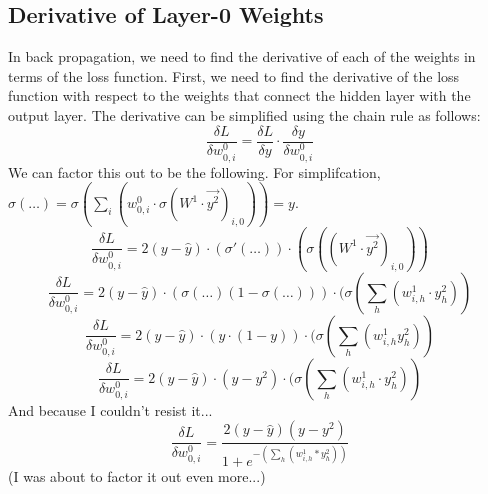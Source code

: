 \documentclass[10pt]{article}
\begin{document}
\subsection{Derivative of Layer-0 Weights}
In back propagation, we need to find the derivative of each of the weights in terms of the loss function. First, we need to find the derivative of the loss function with respect to the weights that connect the hidden layer with the output layer. The derivative can be simplified using the chain rule as follows:
$$\frac{\delta L}{\delta w^0_{0,i}} = \frac{\delta L}{\delta y} \cdot \frac{\delta y}{\delta w^0_{0,i}}$$
We can factor this out to be the following. 
\newline
For simplifcation, $\sigma(\ldots) = \sigma(\sum_i{(w^0_{0,i} \cdot \sigma(W^1 \cdot \vec{y^2})_{i,0})}) = y$.
$$\frac{\delta L}{\delta w^0_{0,i}} = 2(y - \hat{y}) \cdot (\sigma'(\ldots)) \cdot (\sigma((W^1 \cdot \vec{y^2})_{i,0}))$$
$$\frac{\delta L}{\delta w^0_{0,i}} = 2(y - \hat{y}) \cdot (\sigma(\ldots)(1 - \sigma(\ldots))) \cdot (\sigma(\sum_h{(w^1_{i,h} \cdot y^2_{h})})$$
$$\frac{\delta L}{\delta w^0_{0,i}} = 2(y - \hat{y}) \cdot (y \cdot (1 - y)) \cdot (\sigma(\sum_h{(w^1_{i,h} y^2_{h})})$$
$$\frac{\delta L}{\delta w^0_{0,i}} = 2(y - \hat{y}) \cdot (y - y^2) \cdot  (\sigma(\sum_h^{}{(w^1_{i,h} \cdot y^2_{h})})$$
And because I couldn't resist it...
$$\frac{\delta L}{\delta w^0_{0,i}} = \frac{2(y - \hat{y})(y - y^2)}{1 + e^{-(\sum_h^{}{(w^1_{i,h} *y^2_{h})})}}$$
(I was about to factor it out even more...)
\end{document}
